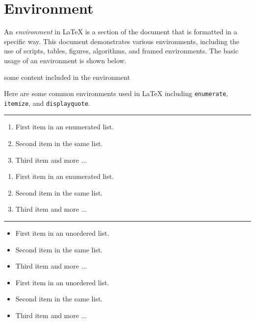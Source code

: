 \section{Environment}

An \emph{environment} in {\LaTeX} is a section of the document that is formatted in a specific way. 
This document demonstrates various environments, including the use of scripts, tables, figures, algorithms, and framed environments.
The basic usage of an environment is shown below.

\begin{latexcode}
\begin{environment}
  some content included in the environment
\end{environment}
\end{latexcode}

Here are some common environments used in {\LaTeX} including \Verb|enumerate|, \Verb|itemize|, and \Verb|displayquote|.

\noindent\rule{\linewidth}{0.5pt}

\begin{multicols}{2}
  \begin{enumerate}
    \item First item in an enumerated list.
    \item Second item in the same list.
    \item Third item and more ...
  \end{enumerate}
  \begin{latexcode}
\begin{enumerate}
  \item First item in an enumerated list.
  \item Second item in the same list.
  \item Third item and more ...
\end{enumerate}
  \end{latexcode}
\end{multicols}

\noindent\rule{\linewidth}{0.5pt}

\begin{multicols}{2}
  \begin{itemize}
    \item First item in an unordered list.
    \item Second item in the same list.
    \item Third item and more ...
  \end{itemize}
  \begin{latexcode}
\begin{itemize}
  \item First item in an unordered list.
  \item Second item in the same list.
  \item Third item and more ...
\end{itemize}
  \end{latexcode}
\end{multicols}

